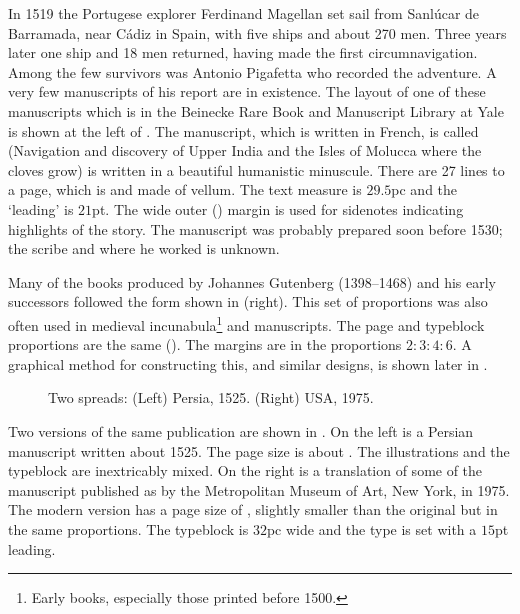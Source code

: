 \documentclass[10pt,letterpaper,extrafontsizes]{memoir}
\begin{document}
    In 1519 the Portugese explorer Ferdinand Magellan set sail from 
Sanl\'{u}car de Barramada, near C\'{a}diz in Spain, 
with five ships and about 270 men.
Three years later one ship and 18 men returned, having made the first
circumnavigation. Among the few survivors was Antonio Pigafetta who recorded
the adventure. 
A very few manuscripts of his report are in existence.
The layout of one of these manuscripts which is in the Beinecke Rare
Book and Manuscript Library at Yale is shown at the left of .
The manuscript, which is written in French, is called 
 (Navigation and discovery
of Upper India and the Isles of Molucca where the cloves grow) is written
in a beautiful humanistic minuscule. 
There are 27 lines to a page, which
is  and made of vellum. The text measure is $29.5$pc
and the `leading' is $21$pt. The wide outer (\foredge) margin is used 
for sidenotes
indicating highlights of the story. The manuscript was probably prepared 
soon before 1530; the scribe and where he worked is unknown.

    Many of the books produced by Johannes Gutenberg
(1398--1468) and his early successors followed the form shown in
 (right). This set of proportions was also often used in
medieval incunabula\footnote{Early books, especially 
those printed before 1500.}  and manuscripts. The page and typeblock 
proportions are the same (). The margins are in the 
proportions $2 : 3 : 4 : 6$.
A graphical method for constructing this, and similar designs, is 
shown later in .

\begin{figure}
\centering
\begin{minipage}[b]{\pwlayi}
\end{minipage}
\hfill
\begin{minipage}[b]{\pwlayi}
\end{minipage}
\caption[Two spreads: Persia, 1525 and USA, 1975]%
        {Two spreads: (Left) Persia, 1525.
         (Right) USA, 1975.} \label{fb:10}
\end{figure}

     Two versions of the same publication are shown in .
On the left is a Persian manuscript  written
about 1525. The page size is about . The 
illustrations and
the typeblock are inextricably mixed. On the right is a translation of
some of the manuscript published as 
by the Metropolitan Museum of Art, New York, in 1975. The modern version
has a page size of , slightly smaller than the original
but in the same proportions. The typeblock is $32$pc wide 
and the type is set with a $15$pt leading.
\end{document}
